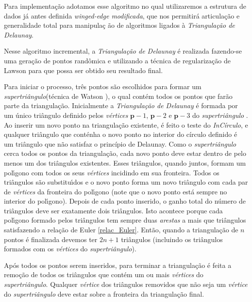 \documentclass[12pt,a4paper]{book}
\begin{document}
Para implementa\c{c}\~{a}o adotamos esse algoritmo no qual utilizaremos a
estrutura de dados j\'{a} antes definida \textit{winged-edge modificada}, que
nos permitir\'{a} articula\c{c}\~{a}o e generalidade total para manipula\c{c}%
\~{a}o de algoritmos ligados \`{a} \textit{Triangula\c{c}\~{a}o de Delaunay}.

Nesse algoritmo incremental, a \textit{Triangula\c{c}\~{a}o de Delaunay} \'{e}
realizada fazendo-se uma gera\c{c}\~{a}o de pontos rand\^omica\cite{guibas} e utilizando a t\'ecnica de regulariza\c{c}\~{a}o de Lawson para que possa ser obtido seu resultado final.

Para iniciar o processo, tr\^{e}s pontos s\~{a}o escolhidos para formar um \textit{supertri\^{a}ngulo}(t\'{e}cnica de Watson \cite{watson}), o qual cont\'{e}m todos os pontos que far\~{a}o parte da triangula\c{c}\~{a}o. Inicialmente a  \textit{Triangula\c{c}\~{a}o de Delaunay} \'{e} formada por um \'{u}nico tri\^{a}ngulo definido pelos \textit{v\'{e}rtices} ${\mathbf p}-1$, ${\mathbf p-2}$ e ${\mathbf p-3}$ do \textit{supertri\^{a}ngulo} . Ao inserir um novo ponto na triangula\c{c}\~{a}o existente, \'e feito o teste do \textit{InC\'irculo}, e qualquer tri\^{a}ngulo que cont\'{e}nha o novo ponto no interior do c\'irculo definido   \'e um tri\^angulo que n\~ao satisfaz o princ\'ipio de Delaunay. Como o \textit{supertri\^{a}ngulo} cerca todos os pontos da triangula\c{c}\~{a}o, cada novo ponto deve estar dentro de pelo menos um dos
tri\^{a}ngulos existentes. Esses tri\^{a}ngulos, quando juntos, formam um pol\'{\i}gono com todos os seus \textit{v\'{e}rtices} incidindo em sua fronteira. Todos os tri\^{a}ngulos s\~{a}o substitu\'{\i}dos e o novo ponto forma um novo tri\^{a}ngulo com cada par de \textit{v\'{e}rtices} da fronteira do pol\'{\i}gono (note que o novo ponto est\'{a} sempre no interior do pol\'{\i}gono). Depois de cada ponto inserido, o ganho total
do n\'{u}mero de tri\^{a}ngulos deve ser exatamente dois tri\^{a}ngulos. Isto acontece porque cada pol\'{\i}gono formado pelos tri\^{a}ngulos tem sempre duas \textit{arestas} a mais que tri\^{a}ngulos satisfazendo a rela\c{c}\~{a}o de Euler \ref{relac_Euler}. Ent\~{a}o, quando a triangula\c{c}\~{a}o de $n$ pontos \'{e} finalizada devemos ter $2n+1$ tri\^{a}ngulos (incluindo os tri\^{a}ngulos formados com os \textit{v\'{e}rtices} do \textit{supertri\^{a}ngulo}).

Ap\'{o}s todos os pontos serem inseridos, para terminar a triangula\c{c}\~{a}o \'{e} feita a remo\c{c}\~{a}o de todos os tri\^{a}ngulos que cont\'{e}m um ou mais \textit{v\'{e}rtices} do \textit{supertri\^{a}ngulo}. Qualquer \textit{v\'{e}rtice} dos tri\^{a}ngulos removidos que n\~{a}o seja um \textit{v\'{e}rtice} do \textit{supertri\^{a}ngulo} deve estar sobre a fronteira da triangula\c{c}\~{a}o final.
\end{document}
